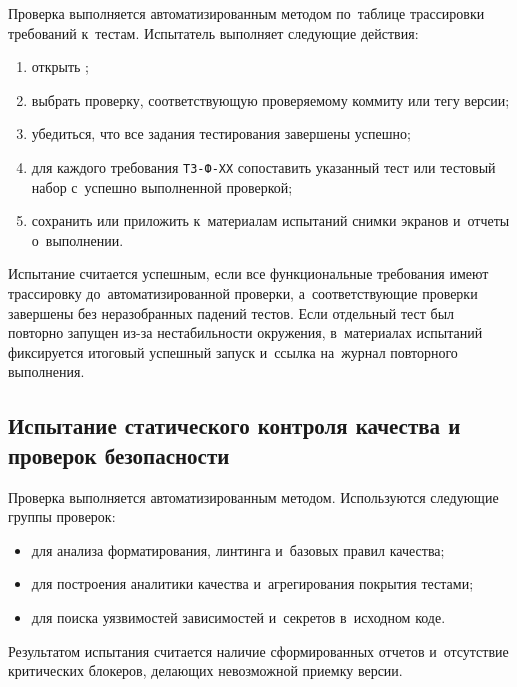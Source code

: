 \documentclass[12pt,a4paper]{extarticle}
\begin{document}
\begin{hseExample}
Проверка выполняется автоматизированным методом по~таблице трассировки требований к~тестам. Испытатель выполняет следующие действия:

\begin{enumerate}[label=\arabic*), leftmargin=1.25cm]
    \item открыть ;
    \item выбрать проверку, соответствующую проверяемому коммиту или тегу версии;
    \item убедиться, что все задания тестирования завершены успешно;
    \item для каждого требования \texttt{ТЗ-Ф-XX} сопоставить указанный тест или тестовый набор с~успешно выполненной проверкой;
    \item сохранить или приложить к~материалам испытаний снимки экранов и~отчеты о~выполнении.
\end{enumerate}

Испытание считается успешным, если все функциональные требования имеют трассировку до~автоматизированной проверки, а~соответствующие проверки завершены без неразобранных падений тестов. Если отдельный тест был повторно запущен из-за нестабильности окружения, в~материалах испытаний фиксируется итоговый успешный запуск и~ссылка на~журнал повторного выполнения.
\end{hseExample}

\subsection{Испытание статического контроля качества и проверок безопасности}

\begin{hseExample}
Проверка выполняется автоматизированным методом. Используются следующие группы проверок:

\begin{itemize}[leftmargin=1.25cm]
    \item {} для анализа форматирования, линтинга и~базовых правил качества;
    \item {} для построения аналитики качества и~агрегирования покрытия тестами;
    \item {} для поиска уязвимостей зависимостей и~секретов в~исходном коде.
\end{itemize}

Результатом испытания считается наличие сформированных отчетов и~отсутствие критических блокеров, делающих невозможной приемку версии.
\end{hseExample}
\end{document}
